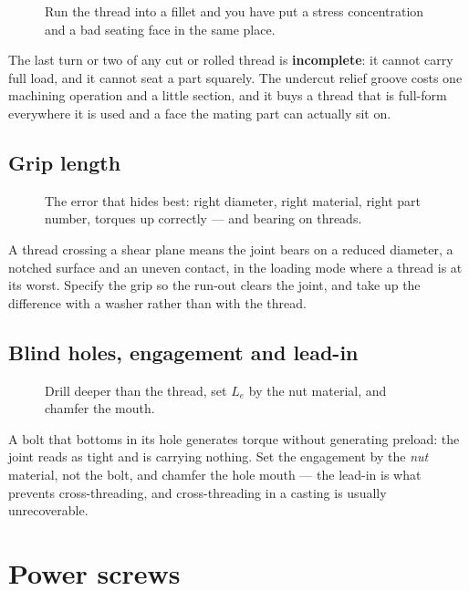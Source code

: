 \documentclass[11pt,a4paper]{article}
\begin{document}
\begin{figure}[H]\centering
\resizebox{0.92\textwidth}{!}{}
\caption{Run the thread into a fillet and you have put a stress concentration and a bad seating face
in the same place.}
\end{figure}

The last turn or two of any cut or rolled thread is \textbf{incomplete}: it cannot carry full load,
and it cannot seat a part squarely. The undercut relief groove costs one machining operation and a
little section, and it buys a thread that is full-form everywhere it is used and a face the mating
part can actually sit on.

\subsection{Grip length}\label{sec:grip}

\begin{figure}[H]\centering
\resizebox{0.92\textwidth}{!}{}
\caption{The error that hides best: right diameter, right material, right part number, torques up
correctly --- and bearing on threads.}
\end{figure}

A thread crossing a shear plane means the joint bears on a reduced diameter, a notched surface and an
uneven contact, in the loading mode where a thread is at its worst. Specify the grip so the run-out
clears the joint, and take up the difference with a washer rather than with the thread.

\subsection{Blind holes, engagement and lead-in}

\begin{figure}[H]\centering
\resizebox{0.90\textwidth}{!}{}
\caption{Drill deeper than the thread, set $L_e$ by the nut material, and chamfer the mouth.}
\end{figure}

A bolt that bottoms in its hole generates torque without generating preload: the joint reads as tight
and is carrying nothing. Set the engagement by the \emph{nut} material, not the bolt, and chamfer the
hole mouth --- the lead-in is what prevents cross-threading, and cross-threading in a casting is
usually unrecoverable.

\section{Power screws}
\end{document}
